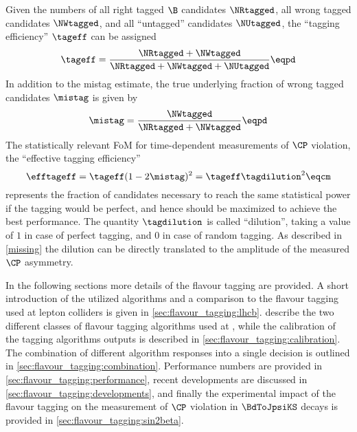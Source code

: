 Given the numbers of all right tagged $\B$ candidates $\NRtagged$, all wrong
tagged candidates $\NWtagged$, and all \enquote{untagged} candidates
$\NUtagged$, the \enquote{tagging efficiency} $\tageff$ can be assigned
%
\begin{equation}\label{eq:flavour_tagging:tageff}
  \tageff = \frac{\NRtagged + \NWtagged}{\NRtagged + \NWtagged + \NUtagged}\eqpd
\end{equation}
%
In addition to the mistag estimate, the true underlying fraction of wrong tagged
candidates $\mistag$ is given by
%
\begin{equation}\label{eq:flavour_tagging:mistag}
  \mistag = \frac{\NWtagged}{\NRtagged + \NWtagged}\eqpd
\end{equation}
%
The statistically relevant \acl{FoM} for time-dependent measurements of $\CP$
violation, the \enquote{effective
tagging efficiency}
%
\begin{equation}\label{eq:flavour_tagging:efftageff}
  \efftageff = \tageff(1 - 2 \mistag)^2 = \tageff \tagdilution^2 \eqcm
\end{equation}
%
represents the fraction of candidates necessary to reach the same statistical
power if the tagging would be perfect, and hence should be maximized to achieve
the best performance. The quantity $\tagdilution$ is called \enquote{dilution},
taking a value of $1$ in case of perfect tagging, and $0$ in case of random
tagging. As described in \cref{missing} the dilution can be directly translated
to the amplitude of the measured $\CP$ asymmetry. 

In the following sections more details of the flavour tagging are provided. A
short introduction of the utilized algorithms and a comparison to the flavour
tagging used at lepton colliders is given in \cref{sec:flavour_tagging:lhcb}.
 describe the two different
classes of flavour tagging algorithms used at \LHCb, while the calibration of
the tagging algorithms outputs is described in
\cref{sec:flavour_tagging:calibration}. The combination of different algorithm
responses into a single decision is outlined in
\cref{sec:flavour_tagging:combination}. Performance numbers are provided in
\cref{sec:flavour_tagging:performance}, recent developments are discussed in
\cref{sec:flavour_tagging:developments}, and finally the experimental impact of
the flavour tagging on the measurement of $\CP$ violation in $\BdToJpsiKS$
decays is provided in \cref{sec:flavour_tagging:sin2beta}.

